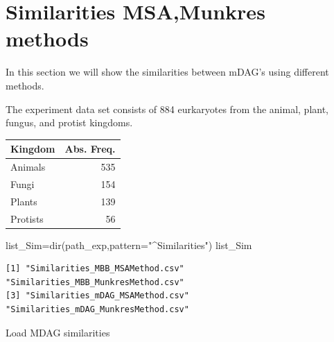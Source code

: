 \documentclass[
  letterpaper,
  DIV=11,
  numbers=noendperiod]{scrreprt}
\newenvironment{Shaded}{}{}
\newcommand{\AttributeTok}[1]{\textcolor[rgb]{0.78,0.47,0.87}{#1}}
\newcommand{\DecValTok}[1]{\textcolor[rgb]{0.82,0.60,0.40}{#1}}
\newcommand{\FunctionTok}[1]{\textcolor[rgb]{0.38,0.69,0.94}{#1}}
\newcommand{\NormalTok}[1]{\textcolor[rgb]{0.67,0.70,0.75}{#1}}
\newcommand{\OtherTok}[1]{\textcolor[rgb]{0.15,0.68,0.38}{#1}}
\newcommand{\SpecialCharTok}[1]{\textcolor[rgb]{0.34,0.71,0.76}{#1}}
\newcommand{\StringTok}[1]{\textcolor[rgb]{0.60,0.76,0.47}{#1}}
\begin{document}
\hypertarget{similarities-msamunkres-methods}{%
\section{Similarities MSA,Munkres
methods}\label{similarities-msamunkres-methods}}

In this section we will show the similarities between mDAG's using
different methods.

The experiment data set consists of 884 eurkaryotes from the animal,
plant, fungus, and protist kingdoms.

\begin{tabular}{l|r}
\hline
Kingdom & Abs. Freq.\\
\hline
Animals & 535\\
\hline
Fungi & 154\\
\hline
Plants & 139\\
\hline
Protists & 56\\
\hline
\end{tabular}

\begin{Shaded}
\begin{Highlighting}[]
\NormalTok{list\_Sim}\OtherTok{=}\FunctionTok{dir}\NormalTok{(path\_exp,}\AttributeTok{pattern=}\StringTok{"\^{}Similarities"}\NormalTok{)}
\NormalTok{list\_Sim}
\end{Highlighting}
\end{Shaded}

\begin{verbatim}
[1] "Similarities_MBB_MSAMethod.csv"      "Similarities_MBB_MunkresMethod.csv" 
[3] "Similarities_mDAG_MSAMethod.csv"     "Similarities_mDAG_MunkresMethod.csv"
\end{verbatim}

Load MDAG similarities

\begin{Shaded}
\end{Shaded}
\end{document}
